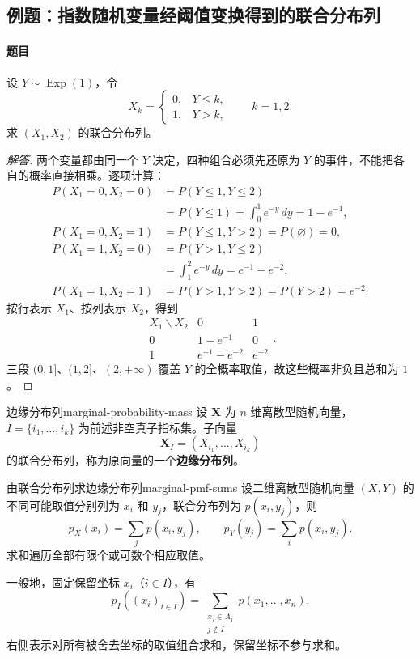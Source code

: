 \subsection{例题：指数随机变量经阈值变换得到的联合分布列}\label{note:c3:e1}
\paragraph{题目}
设 $Y\sim\operatorname{Exp}(1)$，令
\[
X_k=
\begin{cases}
0,&Y\leq k,\\
1,&Y>k,
\end{cases}
\qquad k=1,2.
\]
求 $(X_1,X_2)$ 的联合分布列。

\begin{proof}[解答]
两个变量都由同一个 $Y$ 决定，四种组合必须先还原为 $Y$ 的事件，不能把各自的概率直接相乘。逐项计算：
\begin{align*}
P(X_1=0,X_2=0)
&=P(Y\leq1,Y\leq2)\\
&=P(Y\leq1)=\int_0^1e^{-y}\,dy
=1-e^{-1},\\
P(X_1=0,X_2=1)
&=P(Y\leq1,Y>2)=P(\varnothing)=0,\\
P(X_1=1,X_2=0)
&=P(Y>1,Y\leq2)\\
&=\int_1^2e^{-y}\,dy=e^{-1}-e^{-2},\\
P(X_1=1,X_2=1)
&=P(Y>1,Y>2)=P(Y>2)=e^{-2}.
\end{align*}
按行表示 $X_1$、按列表示 $X_2$，得到
\[
\begin{array}{c|cc}
X_1\backslash X_2&0&1\\ \hline
0&1-e^{-1}&0\\
1&e^{-1}-e^{-2}&e^{-2}
\end{array}.
\]
三段 $(0,1]$、$(1,2]$、$(2,+\infty)$ 覆盖 $Y$ 的全概率取值，故这些概率非负且总和为 $1$。
\end{proof}

\begin{mydefinition}{边缘分布列}{marginal-probability-mass}
设 $\boldsymbol X$ 为 $n$ 维离散型随机向量，$I=\{i_1,\ldots,i_k\}$ 为前述非空真子指标集。子向量
\[
\boldsymbol X_I=(X_{i_1},\ldots,X_{i_k})
\]
的联合分布列，称为原向量的一个\textbf{边缘分布列}。
\end{mydefinition}

\begin{proposition}{由联合分布列求边缘分布列}{marginal-pmf-sums}
设二维离散型随机向量 $(X,Y)$ 的不同可能取值分别列为 $x_i$ 和 $y_j$，联合分布列为 $p(x_i,y_j)$，则
\[
p_X(x_i)=\sum_jp(x_i,y_j),\qquad
p_Y(y_j)=\sum_ip(x_i,y_j).
\]
求和遍历全部有限个或可数个相应取值。

一般地，固定保留坐标 $x_i$（$i\in I$），有
\[
p_I((x_i)_{i\in I})
=\sum_{\substack{x_j\in A_j\\j\notin I}}
p(x_1,\ldots,x_n).
\]
右侧表示对所有被舍去坐标的取值组合求和，保留坐标不参与求和。
\end{proposition}

